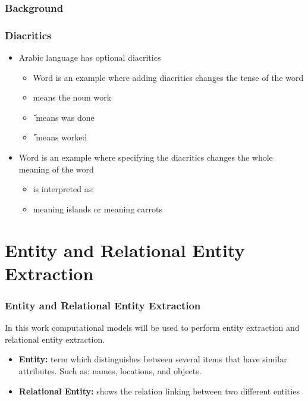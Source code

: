 \documentclass[xcolor=table]{beamer}
\begin{document}
\begin{frame}[<+->]
\frametitle{Background}
\frametitle{Diacritics}
\begin{itemize}
\item Arabic language has optional diacritics
\begin{itemize}
   \item Word \textbf{} is an example where adding diacritics changes the tense of the word
\item  \textbf{  } means the noun work
\item \textbf{َ} means was done
\item  \textbf{َ} means worked
\end{itemize}

\item Word\textbf{   }is an example where specifying the diacritics changes the whole meaning of the word
\begin{itemize}
    \item \textbf{ }is interpreted as:
    
    \item \textbf{}
meaning islands or \textbf{} meaning carrots
\end{itemize}
\end{itemize}

\end{frame}
\section{Entity and Relational Entity Extraction}
\begin{frame}
\frametitle{Entity and Relational Entity Extraction}


In this work computational models will be used to perform entity extraction and relational entity extraction.
\begin{itemize}
\item \textbf{Entity:} term which distinguishes between several items that have similar attributes. Such as: names, locations, and objects.

\item\textbf{Relational Entity:} shows the relation linking between two different entities
\end{itemize}

\end{frame}

\end{document}
